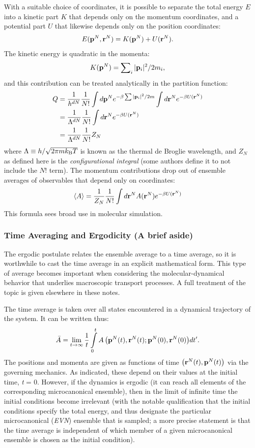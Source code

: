 \documentclass[]{article}
\begin{document}
With a suitable choice of coordinates, it is possible to separate the
total energy $E$ into a kinetic part $K$ that depends only on
the momentum coordinates, and a potential part $U$ that likewise
depends only on the position coordinates:
\[E({{\bf{p}}^N},{{\bf{r}}^N}) = K({{\bf{p}}^N}) + U({{\bf{r}}^N}).\]
The kinetic energy is quadratic in the momenta:
\[K({{\bf p}^N}) = \sum\nolimits_i {|{\bf p}_i|^2/2{m_i}}, \]
and this contribution can be treated analytically in the partition
function:
\begin{align}
Q &= \frac{1}{{h^{dN}}}\frac{1}{N!}\int {d{{\bf p}^N}{e^{ - \beta \sum {|{\bf p}_i|^2/2m} }}\int {d{{\bf r}^N}} {e^{ - \beta U({{\bf r}^N})}}} \nonumber\\
 &= \frac{1}{{\Lambda ^{dN}}}\frac{1}{N!}\int {d{{\bf r}^N}} {e^{ - \beta U({{\bf r}^N})}}\nonumber\\
 &= \frac{1}{{\Lambda ^{dN}}}\frac{1}{N!}{Z_N}\nonumber
\end{align}
where $\Lambda \equiv h/\sqrt{2\pi mk_{\rm B}T}$ is known as the thermal de Broglie wavelength, and
$Z_N$ as defined here is the \emph{configurational
integral} (some authors define it to not include the ${N}!$ term).
The momentum contributions drop out of ensemble averages of observables
that depend only on coordinates:
\[\left\langle A \right\rangle  = \frac{1}{{{Z_N}}}\frac{1}{{N!}}\int {d{{\bf{r}}^N}A({{\bf{r}}^N}){e^{ - \beta U({{\bf{r}}^N})}}} \]
This formula sees broad use in molecular simulation.

\subsubsection{Time Averaging and Ergodicity (A brief
aside)}\label{time-averaging-and-ergodicity-a-brief-aside}

The ergodic postulate relates the ensemble average to a time average, so
it is worthwhile to cast the time average in an explicit mathematical
form. This type of average becomes important when considering the
molecular-dynamical behavior that underlies macroscopic transport
processes. A full treatment of the topic is given elsewhere in these notes.

The time average is taken over all states encountered in a dynamical
trajectory of the system. It can be written thus:
\[\bar A = \mathop {\lim }\limits_{t \to \infty } \frac{1}{t}\int\limits_0^t {A\left( {{{\bf{p}}^N}(t),{{\bf{r}}^N}(t);{{\bf{p}}^N}(0),{{\bf{r}}^N}(0)} \right)} dt'.\]
The positions and momenta are given as functions of time $\left( {{{\bf{r}}^N}(t),{{\bf{p}}^N}(t)} \right)$ via the
governing mechanics. As indicated, these depend on their values at the
initial time, \emph{t} = 0. However, if the dynamics is ergodic (it can
reach all elements of the corresponding microcanonical ensemble), then
in the limit of infinite time the initial conditions become irrelevant
(with the notable qualification that the initial conditions specify the
total energy, and thus designate the particular microcanonical (\emph{EVN})
ensemble that is sampled; a more precise statement is that the time
average is independent of which member of a given microcanonical
ensemble is chosen as the initial condition).
\end{document}

